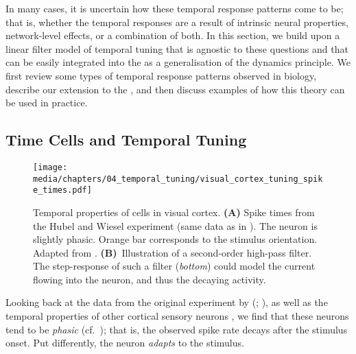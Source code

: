 In many cases, it is uncertain how these temporal response patterns come to be; that is, whether the temporal responses are a result of intrinsic neural properties, network-level effects, or a combination of both. 
In this section, we build upon a linear filter model of temporal tuning \citep{watson1983look,adelson1985spatiotemporal} that is agnostic to these questions and that can be easily integrated into the \NEF as a generalisation of the dynamics principle.
We first review some types of temporal response patterns observed in biology, describe our extension to the \NEF, and then discuss examples of how this theory can be used in practice.

\subsection{Time Cells and Temporal Tuning}
\label{sec:temporal_tuning_biology}

\begin{figure}
	\centering
	\texttt{[image: media/chapters/04\_temporal\_tuning/visual\_cortex\_tuning\_spike\_times.pdf]}%
	{\label{fig:visual_cortex_tuning_spike_times_a}}%
	{\label{fig:visual_cortex_tuning_spike_times_b}}%
	\caption[Temporal properties of cells in visual cortex]{
		Temporal properties of cells in visual cortex.
		\textbf{(A)} Spike times from the Hubel and Wiesel experiment (same data as in ).
		The neuron is slightly phasic.
		Orange bar corresponds to the stimulus orientation.
		Adapted from \citet[Figure~3]{hubel1959receptive}.
		\textbf{(B)}~Illustration of a second-order high-pass filter. The step-response of such a filter (\emph{bottom}) could model the current flowing into the neuron, and thus the decaying activity.
	}
	\label{fig:visual_cortex_tuning_spike_times}
\end{figure}

Looking back at the data from the original experiment by \citeauthor{hubel1959receptive} (\citeyear{hubel1959receptive}; ), as well as the temporal properties of other cortical sensory neurons \citep[cf.][Part~V]{kandel2012principles}, we find that these neurons tend to be \emph{phasic} (cf.~); that is, the observed spike rate decays after the stimulus onset.
Put differently, the neuron \emph{adapts} to the stimulus.

